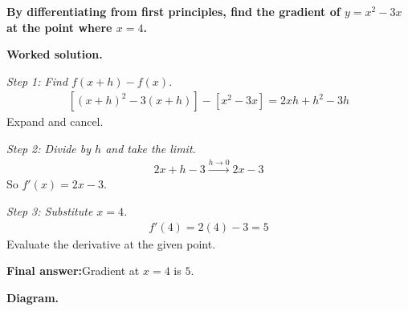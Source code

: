 \documentclass[11pt]{article}
\newcommand{\question}[1]{\par\medskip\noindent\textbf{#1}\par}
\begin{document}
\question{By differentiating from first principles, find the gradient of \( y = x^2 - 3x \) at the point where \( x = 4 \).}

\textbf{Worked solution.}

\textit{Step 1: Find \( f(x+h) - f(x) \).}
\[\begin{gathered}
[(x+h)^2 - 3(x+h)] - [x^2 - 3x] = 2xh + h^2 - 3h
\end{gathered}\]
Expand and cancel.

\textit{Step 2: Divide by \( h \) and take the limit.}
\[\begin{gathered}
2x + h - 3 \xrightarrow{h \to 0} 2x - 3
\end{gathered}\]
So \( f'(x) = 2x - 3 \).

\textit{Step 3: Substitute \( x = 4 \).}
\[\begin{gathered}
f'(4) = 2(4) - 3 = 5
\end{gathered}\]
Evaluate the derivative at the given point.

\begin{answerbox}
\textbf{Final answer:}\quad Gradient at \(\displaystyle  x = 4 \) is \(\displaystyle  5 \).
\end{answerbox}
\textbf{Diagram.}
\end{document}
